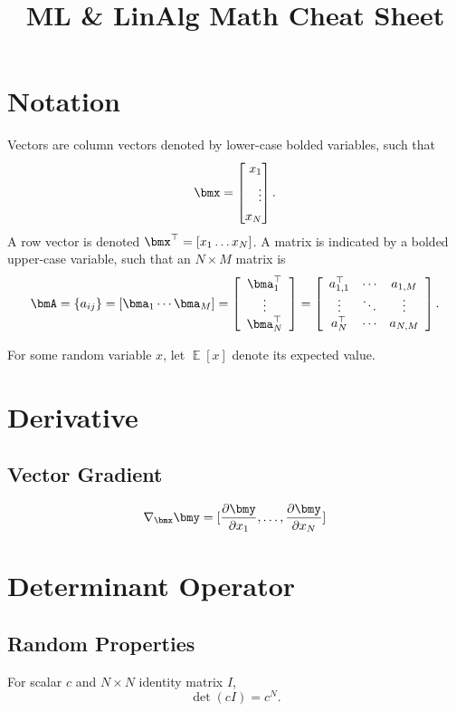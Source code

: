 \documentclass[11pt]{article}
\title{ML \& LinAlg Math Cheat Sheet}
\DeclareMathOperator{\E}{\mathbb{E}}
\begin{document}
\maketitle
\tableofcontents

\section{Notation}
Vectors are column vectors denoted by lower-case bolded variables, such that 
\[\bmx = \left[ \begin{split}
x_1 \\ \vdots \\ x_N 
\end{split} \right]. \]
A row vector is denoted $\bmx^\top = [x_1 \ldots x_N]$.
A matrix is indicated by a bolded upper-case variable, such that an $N \times M$ matrix is
\begin{align*}
\bmA = \{a_{ij}\} = [\bma_1 \cdots \bma_M ] =
\left[\begin{array}{c}
\bma_1^\top \\
\vdots \\
\bma_N^\top
\end{array}\right]
=
\left[\begin{array}{ccc}
a_{1,1}^\top & \cdots & a_{1, M} \\
\vdots & \ddots & \vdots \\
a_N^\top & \cdots & a_{N, M}
\end{array}\right].
\end{align*}

For some random variable $x$, let $\E[x]$ denote its expected value.

\section{Derivative}
\subsection{Vector Gradient}
\begin{equation}
\nabla_{\bmx} \bmy = [\frac{\partial \bmy}{\partial x_1}, \ldots, \frac{\partial \bmy}{\partial x_N}]
\label{eq:Derivative-random_vector}
\end{equation}

\section{Determinant Operator}
\subsection{Random Properties}
For scalar $c$ and $N\times N$ identity matrix $I$,
\[ \det(cI) = c^N. \]
\end{document}
